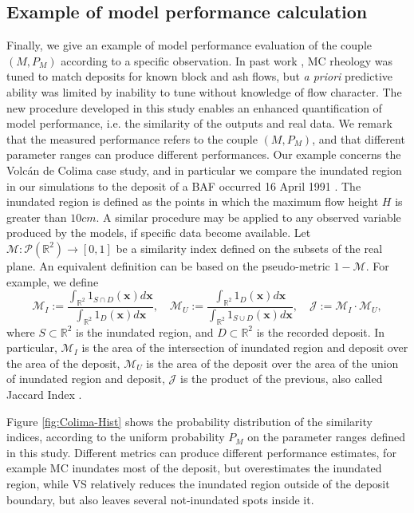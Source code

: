 \documentclass{article}
\begin{document}
\subsection{Example of model performance calculation}
Finally, we give an example of model performance evaluation of the couple $\left(M, P_M\right)$ according to a specific observation. In past work \citep{Patra2005}, MC rheology was tuned to match deposits for known block and ash flows, but {\it a priori} predictive ability was limited by inability to tune without knowledge of flow character. The new procedure developed in this study enables an enhanced quantification of model performance, i.e. the similarity of the outputs and real data. We remark that the measured performance refers to the couple $\left(M, P_M\right)$, and that different parameter ranges can produce different performances. Our example concerns the Volc{\'a}n de Colima case study, and in particular we compare the inundated region in our simulations to the deposit of a BAF occurred 16 April 1991 \citep{Saucedo2004, Rupp2004, Rupp2006}. The inundated region is defined as the points in which the maximum flow height $H$ is greater than $10 cm$. A similar procedure may be applied to any observed variable produced by the models, if specific data become available. Let $\mathcal M:\mathcal P(\mathbb R^2)\rightarrow[0,1]$ be a similarity index defined on the subsets of the real plane. An equivalent definition can be based on the pseudo-metric $1-\mathcal M$. For example, we define
$$\mathcal M_I:=\frac{\int_{\mathbb R^2} 1_{S \cap D}(\textbf{x}) d\textbf{x}}{\int_{\mathbb R^2} 1_D(\textbf{x})d\textbf{x}},\quad \mathcal M_U:=\frac{\int_{\mathbb R^2} 1_D(\textbf{x})d\textbf{x}}{\int_{\mathbb R^2} 1_{S \cup D}(\textbf{x}) d\textbf{x}}, \quad \mathcal J:=\mathcal M_I\cdot \mathcal M_U,$$
where $S\subset \mathbb R^2$ is the inundated region, and $D\subset \mathbb R^2$ is the recorded deposit. In particular, $\mathcal M_I$ is the area of the intersection of inundated region and deposit over the area of the deposit, $\mathcal M_U$ is the area of the deposit over the area of the union of inundated region and deposit, $\mathcal J$ is the product of the previous, also called Jaccard Index \citep{Jaccard1901}.

Figure \ref{fig:Colima-Hist} shows the probability distribution of the similarity indices, according to the uniform probability $P_M$ on the parameter ranges defined in this study. Different metrics can produce different performance estimates, for example MC inundates most of the deposit, but overestimates the inundated region, while VS relatively reduces the inundated region outside of the deposit boundary, but also leaves several not-inundated spots inside it.
\end{document}
